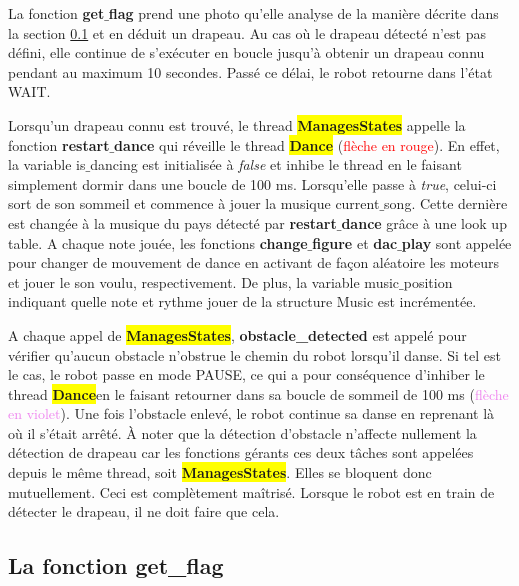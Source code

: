 \documentclass{article}
\newcommand{\state}{\colorbox{yellow}{\textbf{ManagesStates}}}
\newcommand{\dance}{\colorbox{yellow}{\textbf{Dance}}}
\begin{document}
    La fonction \textbf{get$\_$flag} prend une photo qu'elle analyse de la manière décrite dans la section \ref{get_flag} et en déduit un drapeau. 
    Au cas où le drapeau détecté n'est pas défini, elle continue de s'exécuter en boucle jusqu'à obtenir un drapeau connu pendant au maximum 10 secondes. 
    Passé ce délai, le robot retourne dans l'état \textcolor{bleu}{WAIT}. \\ \par
    
    Lorsqu'un drapeau connu est trouvé, le thread \colorbox{yellow}{\textbf{ManagesStates}} appelle la fonction \textbf{restart$\_$dance} qui réveille le thread \colorbox{yellow}{\textbf{Dance}} (\textcolor{red}{flèche en rouge}). 
    En effet, la variable \textcolor{bleu}{is$\_$dancing} est initialisée à \textit{false} et inhibe le thread en le faisant simplement dormir dans une boucle de 100 ms. 
    Lorsqu'elle passe à \textit{true}, celui-ci sort de son sommeil et commence à jouer la musique \textcolor{bleu}{current$\_$song}.
    Cette dernière est changée à la musique du pays détecté par \textbf{restart$\_$dance} grâce à une look up table. 
    A chaque note jouée, les fonctions \textbf{change$\_$figure} et \textbf{dac$\_$play} sont appelée pour changer de mouvement de dance en activant de façon aléatoire les moteurs et jouer le son voulu, respectivement. 
    De plus, la variable \textcolor{bleu}{music$\_$position} indiquant quelle note et rythme jouer de la structure \textcolor{bleu}{Music} est incrémentée. \\ \par
    
    A chaque appel de \state, \textbf{obstacle\_detected} est appelé pour vérifier qu'aucun obstacle n'obstrue le chemin du robot lorsqu'il danse. 
    Si tel est le cas, le robot passe en mode \textcolor{bleu}{PAUSE}, ce qui a pour conséquence d'inhiber le thread \dance en le faisant retourner dans sa boucle de sommeil de 100 ms (\textcolor{violet}{flèche en violet}). 
    Une fois l'obstacle enlevé, le robot continue sa danse en reprenant là où il s'était arrêté. 
    À noter que la détection d'obstacle n'affecte nullement la détection de drapeau car les fonctions gérants ces deux tâches sont appelées depuis le même thread, soit \state.
    Elles se bloquent donc mutuellement.
    Ceci est complètement maîtrisé.
    Lorsque le robot est en train de détecter le drapeau, il ne doit faire que cela.

    \subsection{La fonction get\_flag}
    \label{get_flag}
    
\end{document}
